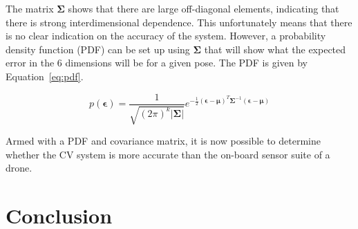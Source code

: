 The matrix $\bm{\Sigma}$ shows that there are large off-diagonal elements, indicating that there is strong interdimensional dependence. This unfortunately means that there is no clear indication on the accuracy of the system. However, a probability density function (PDF) can be set up using $\bm{\Sigma}$ that will show what the expected error in the 6 dimensions will be for a given pose. The PDF is given by Equation~\ref{eq:pdf}.

\begin{equation}
  \label{eq:pdf}
  p(\bm{\epsilon}) = \frac{1}{\sqrt{{(2\pi)}^k\lvert\bm{\Sigma}\rvert}}e^{-\frac{1}{2}{(\bm{\epsilon} - \bm{\mu})}^T\bm{\Sigma}^{-1}(\bm{\epsilon} - \bm{\mu})}
\end{equation}

Armed with a PDF and covariance matrix, it is now possible to determine whether the CV system is more accurate than the on-board sensor suite of a drone. 

\section{Conclusion}

